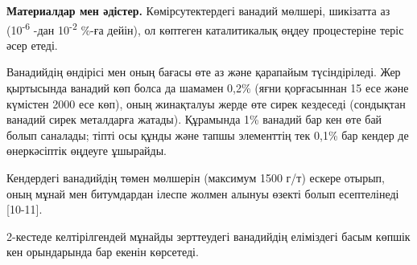 \begin{multicols}{2}
{\bfseries Материалдар мен әдістер.} Көмірсутектердегі ванадий мөлшері, шикізатта аз
(10\textsuperscript{-6} -дан 10\textsuperscript{-2} \%-ға дейін), ол
көптеген каталитикалық өңдеу процестеріне теріс әсер етеді.

Ванадийдің өндірісі мен оның бағасы өте аз және қарапайым түсіндіріледі.
Жер қыртысында ванадий көп болса да шамамен 0,2\% (яғни қорғасыннан 15
есе және күмістен 2000 есе көп), оның жинақталуы жерде өте сирек
кездеседі (сондықтан ванадий сирек металдарға жатады). Құрамында 1\%
ванадий бар кен өте бай болып саналады; тіпті осы құнды және тапшы
элементтің тек 0,1\% бар кендер де өнеркәсіптік өңдеуге ұшырайды.

Кендердегі ванадийдің төмен мөлшерін (максимум 1500 г/т) ескере отырып,
оның мұнай мен битумдардан ілеспе жолмен алынуы өзекті болып
есептелінеді {[}10-11{]}.

2-кестеде келтірілгендей мұнайды зерттеудегі ванадийдің еліміздегі басым
көпшік кен орындарында бар екенін көрсетеді.
\end{multicols}
